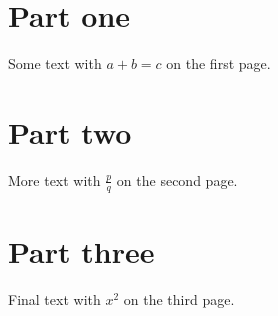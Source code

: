 \documentclass{article}
\begin{document}
\section*{Part one}
Some text with $a+b=c$ on the first page.
\newpage
\section*{Part two}
More text with $\frac{p}{q}$ on the second page.
\newpage
\section*{Part three}
Final text with $x^2$ on the third page.
\end{document}
